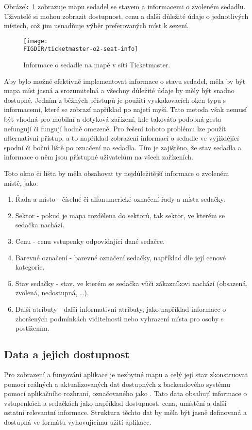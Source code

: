 Obrázek~\ref{fig:ticketmaster-o2-seat-info} zobrazuje mapu sedadel se stavem a informacemi o zvoleném sedadlu.
Uživatelé si mohou zobrazit  dostupnost, cenu a další důležité údaje o jednotlivých místech, což jim usnadňuje výběr preferovaných míst k sezení.

\begin{figure}[H]
    \texttt{[image: \\FIGDIR/ticketmaster-o2-seat-info]}
    \centering
    \caption{Informace o sedadle na mapě v síti Ticketmaster.}
    \label{fig:ticketmaster-o2-seat-info}
\end{figure}

Aby bylo možné efektivně implementovat informace o stavu sedadel, měla by být mapa míst jasná a srozumitelná a všechny důležité údaje by měly být snadno dostupné.
Jedním z běžných přístupů je použití vyskakovacích oken typu  s informacemi, které se zobrazí  například po najetí myší.
Tato metoda však nemusí být vhodná pro mobilní a dotyková zařízení, kde takováto podobná gesta nefungují či fungují hodně omezeně.
Pro řešení tohoto problému lze použít alternativní přístup, a to například zobrazení informací o sedadle ve vyjíždějící spodní či boční liště po označení na sedadla.
Tím je zajištěno, že stav sedadla a informace o něm jsou přístupné uživatelům na všech zařízeních.

Toto okno či lišta by měla obsahovat ty nejdůležitější informace o zvoleném místě, jako:
\begin{enumerate}
    \item Řada a místo - číselné či alfanumerické označení řady a místa sedačky.
    \item Sektor - pokud je mapa rozdělena do sektorů, tak sektor, ve kterém se sedačka nachází.
    \item Cenu - cenu vstupenky odpovídající dané sedačce.
    \item Barevné označení - barevné označení sedačky, například dle její cenové kategorie.
    \item Stav sedačky - stav, ve kterém se sedačka vůči zákazníkovi nachází (obsazená, zvolená, nedostupná, \ldots).
    \item Další atributy - další informativní atributy, jako například informace o zhoršených podmínkách viditelnosti nebo vyhrazení místa pro osoby s postižením.
\end{enumerate}


\subsection{Data a jejich dostupnost}
\label{sec:specifikace-interaktivni-mapa-data-a-dostupnost}
Pro zobrazení a fungování aplikace je nezbytné mapu a celý její stav zkonstruovat pomocí reálných a aktualizovaných dat dostupných z backendového systému pomocí aplikačního rozhraní, označovaného jako .
Tato data obsahují informace o vstupenkách a sedačkách jako například dostupnost, cena, umístění a další ostatní relevantní informace.
Struktura těchto dat by měla být jasně definovaná a dostupná ve formátu vyhovujícímu užití aplikace.


